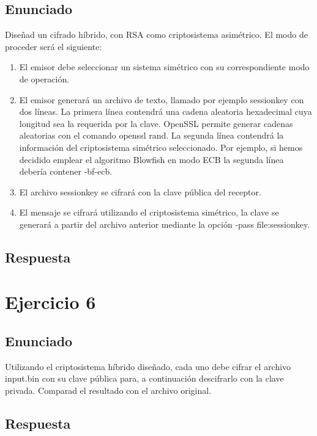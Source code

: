 \documentclass[10pt,a4paper,spanish]{report}
\begin{document}
\section{Enunciado}
\noindent
Diseñad un cifrado híbrido, con RSA como criptosistema asimétrico. El modo de proceder será el siguiente:
\begin{enumerate}
 \item El emisor debe seleccionar un sistema simétrico con su correspondiente modo de operación.
 \item El emisor generará un archivo de texto, llamado por ejemplo sessionkey con dos líneas. La primera línea contendrá una cadena aleatoria hexadecimal cuya longitud sea la requerida por la clave. OpenSSL permite generar cadenas aleatorias con el comando openssl rand. La segunda línea contendrá la información del criptosistema simétrico seleccionado. Por ejemplo, si hemos decidido emplear el algoritmo Blowfish en modo ECB la segunda línea debería contener -bf-ecb.
 \item El archivo sessionkey se cifrará con la clave pública del receptor.
 \item El mensaje se cifrará utilizando el criptosistema simétrico, la clave se generará a partir del archivo anterior mediante la opción -pass file:sessionkey.
\end{enumerate}

\section{Respuesta}
\noindent

\chapter{Ejercicio 6}

\section{Enunciado}
\noindent
Utilizando el criptosistema híbrido diseñado, cada uno debe cifrar el archivo input.bin con su clave pública para, a continuación descifrarlo con la clave privada. Comparad el resultado con el archivo original.

\section{Respuesta}
\noindent
\end{document}
